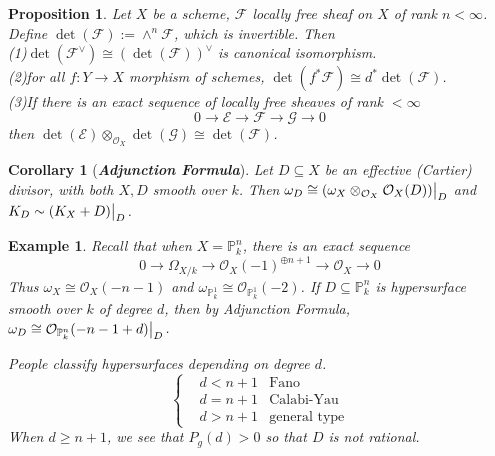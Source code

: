 \documentclass{ctexart}
\newtheorem{proposition}{Proposition}[section]
\newtheorem{example}{Example}[section]
\newtheorem{corollary}{Corollary}[section]
\begin{document}
\begin{proposition}
    Let $X$ be a scheme, $\mathcal{F}$ locally free sheaf on $X$ of rank $n < \infty$.
    Define $\det(\mathcal{F}) := \wedge^{n} \mathcal{F}$, which is invertible.
    Then \\
    (1)$\det(\mathcal{F}^{\lor}) \cong (\det(\mathcal{F}))^{\lor}$ is canonical isomorphism. \\
    (2)for all $f: Y \longrightarrow X$ morphism of schemes, $\det(f^{\ast}\mathcal{F}) \cong d^{\ast}\det(\mathcal{F})$. \\
    (3)If there is an exact sequence of locally free sheaves of rank $< \infty$
    \begin{equation*}
        0 \longrightarrow \mathcal{E} \longrightarrow \mathcal{F} \longrightarrow \mathcal{G} \longrightarrow 0
    \end{equation*}
    then $\det(\mathcal{E}) \otimes_{\mathcal{O}_{X}} \det(\mathcal{G}) \cong \det(\mathcal{F})$.
    \label{Proposition 9.10}
\end{proposition}
\begin{corollary}[\textbf{\emph{Adjunction Formula}}]
    Let $D \subseteq X$ be an effective (Cartier) divisor, with both $X,D$ smooth over $k$.
    Then $\omega_{D} \cong (\omega_{X} \otimes_{\mathcal{O}_{X}} \mathcal{O}_{X}(D))\big{|}_{D}$ and $K_{D} \sim (K_{X} + D)\big{|}_{D}$.
    \label{Corollary 9.3}
\end{corollary}
\begin{example}
    Recall that when $X = \mathbb{P}_{k}^{n}$, there is an exact sequence
    \begin{equation*}
        0 \longrightarrow \Omega_{X/k} \longrightarrow \mathcal{O}_{X}(-1)^{\oplus n + 1} \longrightarrow \mathcal{O}_{X} \longrightarrow 0
    \end{equation*}
    Thus $\omega_{X} \cong \mathcal{O}_{X}(-n - 1)$ and $\omega_{\mathbb{P}_{k}^{1}} \cong \mathcal{O}_{\mathbb{P}_{k}^{1}}(-2)$.
    If $D \subseteq \mathbb{P}_{k}^{n}$ is hypersurface smooth over $k$ of degree $d$,
    then by Adjunction Formula, $\omega_{D} \cong \mathcal{O}_{\mathbb{P}_{k}^{n}}(-n - 1 + d)\big{|}_{D}$.
    \par
    People classify hypersurfaces depending on degree $d$.
    \begin{equation*}
        \left\{
            \begin{aligned}
                & d < n + 1 & \text{Fano} \\
                & d = n + 1 & \text{Calabi-Yau} \\
                & d > n + 1 & \text{general type}
            \end{aligned}
        \right.
    \end{equation*} 
    When $d \ge n + 1$, we see that $P_{g}(d) > 0$ so that $D$ is not rational.
\end{example}
\end{document}
